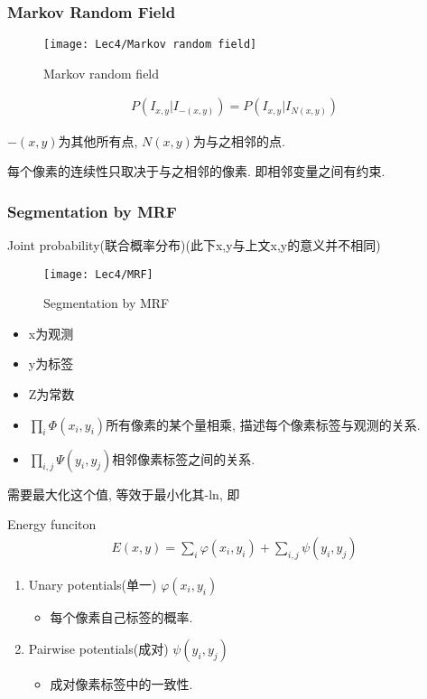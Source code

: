 \subsubsection{Markov Random Field}
\begin{figure}[H]
    \centering
    \texttt{[image: Lec4/Markov random field]}
    \caption{Markov random field}
\end{figure}
\begin{align*}
    P(I_{x,y}|I_{-(x,y)})=P(I_{x,y}|I_{N(x,y)})
\end{align*}

$-(x,y)$为其他所有点, $N(x,y)$为与之相邻的点.

每个像素的连续性只取决于与之相邻的像素. 即相邻变量之间有约束. 

\subsubsection{Segmentation by MRF}
Joint probability(联合概率分布)(此下x,y与上文x,y的意义并不相同)
\begin{figure}[H]
    \centering
    \texttt{[image: Lec4/MRF]}
    \caption{Segmentation by MRF}
\end{figure}
\begin{itemize}
    \item x为观测
    \item y为标签
    \item Z为常数
    \item $\prod_i\Phi(x_i,y_i)$所有像素的某个量相乘, 描述每个像素标签与观测的关系.
    \item $\prod_{i,j}\Psi (y_i,y_j)$相邻像素标签之间的关系.
\end{itemize}

需要最大化这个值, 等效于最小化其-ln, 即

Energy funciton
\begin{align*}
    E(x,y)=\sum_i \varphi(x_i,y_i)+\sum_{i,j}\psi(y_i,y_j)
\end{align*}

\begin{enumerate}
    \item Unary potentials(单一) $\varphi(x_i,y_i)$
    \begin{itemize}
        \item 每个像素自己标签的概率.
    \end{itemize}
    \item Pairwise potentials(成对) $\psi(y_i,y_j)$
    \begin{itemize}
        \item 成对像素标签中的一致性.
    \end{itemize}
\end{enumerate}


